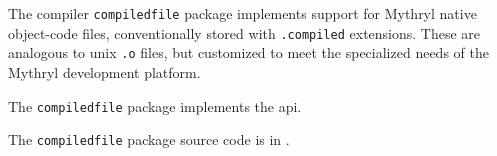 
The compiler {\tt compiledfile} package implements support for Mythryl native object-code files, 
conventionally stored with {\tt .compiled} extensions.  These are analogous to unix 
{\tt .o} files, but customized to meet the specialized needs of the Mythryl 
development platform.

The {\tt compiledfile} package implements the  api.

The {\tt compiledfile} package source code is in .

